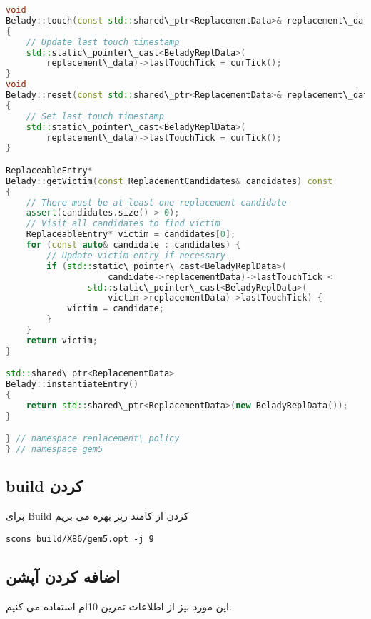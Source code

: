 \begin{latin}
\begin{lstlisting}[language=C++, caption=Algorithm implementation]
void
Belady::touch(const std::shared\_ptr<ReplacementData>& replacement\_data) const
{
    // Update last touch timestamp
    std::static\_pointer\_cast<BeladyReplData>(
        replacement\_data)->lastTouchTick = curTick();
}
void
Belady::reset(const std::shared\_ptr<ReplacementData>& replacement\_data) const
{
    // Set last touch timestamp
    std::static\_pointer\_cast<BeladyReplData>(
        replacement\_data)->lastTouchTick = curTick();
}

ReplaceableEntry*
Belady::getVictim(const ReplacementCandidates& candidates) const
{
    // There must be at least one replacement candidate
    assert(candidates.size() > 0);
    // Visit all candidates to find victim
    ReplaceableEntry* victim = candidates[0];
    for (const auto& candidate : candidates) {
        // Update victim entry if necessary
        if (std::static\_pointer\_cast<BeladyReplData>(
                    candidate->replacementData)->lastTouchTick <
                std::static\_pointer\_cast<BeladyReplData>(
                    victim->replacementData)->lastTouchTick) {
            victim = candidate;
        }
    }
    return victim;
}

std::shared\_ptr<ReplacementData>
Belady::instantiateEntry()
{
    return std::shared\_ptr<ReplacementData>(new BeladyReplData());
}

} // namespace replacement\_policy
} // namespace gem5

\end{lstlisting}
\end{latin}


\subsection*{
    build
    کردن 
    }

برای 
Build
کردن 
از کامند زیر بهره می بریم
\begin{latin}
\begin{lstlisting}[language=linux, caption=cloning gem5]
    scons build/X86/gem5.opt -j 9
\end{lstlisting}
\end{latin}

\subsection*{اضافه کردن آپشن 
    }

این مورد نیز از اطلاعات تمرین 10ام استفاده می کنیم.

